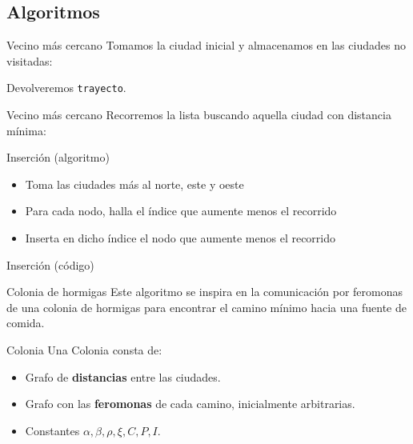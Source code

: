 \subsection{Algoritmos}

\begin{frame}[fragile]{Vecino más cercano}
Tomamos la ciudad inicial y almacenamos en las ciudades no visitadas:

Devolveremos \texttt{trayecto}.
\end{frame}

\begin{frame}[fragile]{Vecino más cercano}
\vspace*{-.5cm}
Recorremos la lista buscando aquella ciudad con distancia mínima:

\end{frame}

\begin{frame}{Inserción (algoritmo)}
  \begin{itemize}
    \item Toma las ciudades más al norte, este y oeste
    \item Para cada nodo, halla el índice que aumente menos el recorrido
    \item Inserta en dicho índice el nodo que aumente menos el recorrido
  \end{itemize}
\end{frame}

\begin{frame}[fragile]{Inserción (código)}
\vspace*{-.5cm}

\end{frame}

\begin{frame}{Colonia de hormigas}
Este algoritmo se inspira en la comunicación por feromonas
de una colonia de hormigas para encontrar el camino mínimo hacia una fuente de comida.
\end{frame}

\begin{frame}{Colonia}
Una Colonia consta de:
\begin{itemize}
  \item Grafo de \textbf{distancias} entre las ciudades.
  \item Grafo con las \textbf{feromonas} de cada camino, inicialmente arbitrarias.
  \item Constantes $\alpha, \beta, \rho, \xi, C, P, I$.
\end{itemize}
\end{frame}

